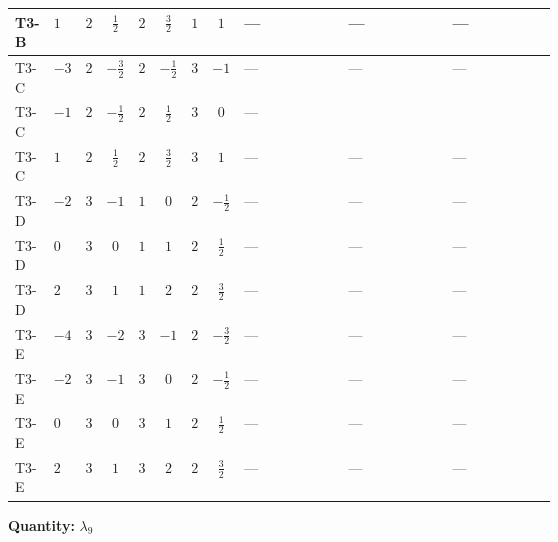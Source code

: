 \documentclass[8pt]{article}
\begin{document}
\begin{landscape}
\begin{longtable}{@{}llcccccc >{\raggedright\arraybackslash}p{0.21\linewidth} >{\raggedright\arraybackslash}p{0.21\linewidth} >{\raggedright\arraybackslash}p{0.21\linewidth}@{}}
\midrule
T3-B & $1$ & $2$ & $\frac{1}{2}$ & $2$ & $\frac{3}{2}$ & $1$ & $1$ & --- & --- & --- \\
\midrule
T3-C & $-3$ & $2$ & $-\frac{3}{2}$ & $2$ & $-\frac{1}{2}$ & $3$ & $-1$ & --- & --- & --- \\
\midrule
T3-C & $-1$ & $2$ & $-\frac{1}{2}$ & $2$ & $\frac{1}{2}$ & $3$ & $0$ & --- & \scriptsize\adjustbox{max width=\linewidth}{$\begin{gathered} +4 {\lambda_{7}} \left({\lambda_{8}}\right)^{*}\end{gathered}$} & \scriptsize\adjustbox{max width=\linewidth}{$\begin{gathered} -9 {g_2}^2 {\lambda_{9}}\end{gathered}$} \\
\midrule
T3-C & $1$ & $2$ & $\frac{1}{2}$ & $2$ & $\frac{3}{2}$ & $3$ & $1$ & --- & --- & --- \\
\midrule
T3-D & $-2$ & $3$ & $-1$ & $1$ & $0$ & $2$ & $-\frac{1}{2}$ & --- & --- & --- \\
\midrule
T3-D & $0$ & $3$ & $0$ & $1$ & $1$ & $2$ & $\frac{1}{2}$ & --- & --- & --- \\
\midrule
T3-D & $2$ & $3$ & $1$ & $1$ & $2$ & $2$ & $\frac{3}{2}$ & --- & --- & --- \\
\midrule
T3-E & $-4$ & $3$ & $-2$ & $3$ & $-1$ & $2$ & $-\frac{3}{2}$ & --- & --- & --- \\
\midrule
T3-E & $-2$ & $3$ & $-1$ & $3$ & $0$ & $2$ & $-\frac{1}{2}$ & --- & --- & --- \\
\midrule
T3-E & $0$ & $3$ & $0$ & $3$ & $1$ & $2$ & $\frac{1}{2}$ & --- & --- & --- \\
\midrule
T3-E & $2$ & $3$ & $1$ & $3$ & $2$ & $2$ & $\frac{3}{2}$ & --- & --- & --- \\
\midrule
\bottomrule
\end{longtable}
\clearpage
\noindent\textbf{Quantity: }$\lambda_{9}$\par\smallskip

\end{landscape}
\end{document}
